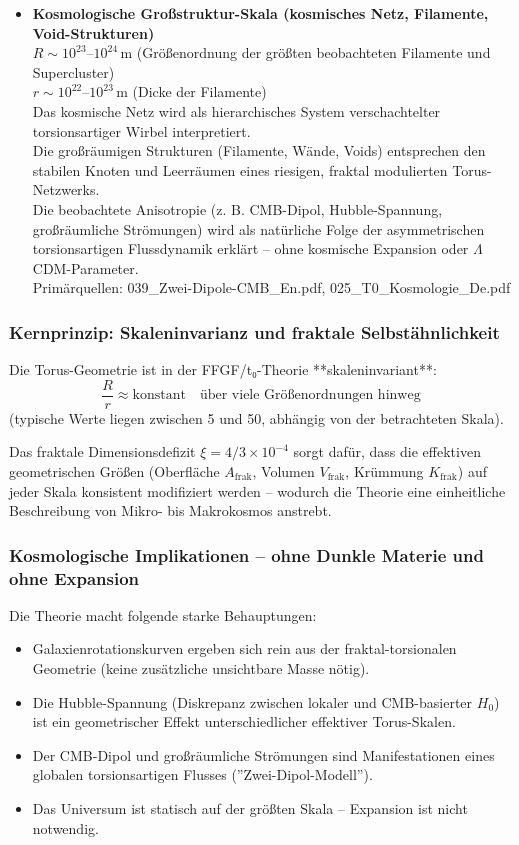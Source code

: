 \documentclass[12pt,a4paper]{article}
\begin{document}
\begin{itemize}
		\item \textbf{Kosmologische Großstruktur-Skala (kosmisches Netz, Filamente, Void-Strukturen)} \\
		$R \sim 10^{23}$–$10^{24}\,\text{m}$ (Größenordnung der größten beobachteten Filamente und Supercluster) \\
		$r \sim 10^{22}$–$10^{23}\,\text{m}$ (Dicke der Filamente) \\
		Das kosmische Netz wird als hierarchisches System verschachtelter torsionsartiger Wirbel interpretiert. \\
		Die großräumigen Strukturen (Filamente, Wände, Voids) entsprechen den stabilen Knoten und Leerräumen eines riesigen, fraktal modulierten Torus-Netzwerks. \\
		Die beobachtete Anisotropie (z. B. CMB-Dipol, Hubble-Spannung, großräumliche Strömungen) wird als natürliche Folge der asymmetrischen torsionsartigen Flussdynamik erklärt – ohne kosmische Expansion oder $\Lambda$CDM-Parameter. \\
		Primärquellen: 039\_Zwei-Dipole-CMB\_En.pdf, 025\_T0\_Kosmologie\_De.pdf
	\end{itemize}
	
	\subsubsection{Kernprinzip: Skaleninvarianz und fraktale Selbstähnlichkeit}
	
	Die Torus-Geometrie ist in der FFGF/t₀-Theorie **skaleninvariant**:
	\[
	\frac{R}{r} \approx \text{konstant} \quad \text{über viele Größenordnungen hinweg}
	\]
	(typische Werte liegen zwischen 5 und 50, abhängig von der betrachteten Skala).
	
	Das fraktale Dimensionsdefizit $\xi = 4/3 \times 10^{-4}$ sorgt dafür, dass die effektiven geometrischen Größen (Oberfläche $A_{\text{frak}}$, Volumen $V_{\text{frak}}$, Krümmung $K_{\text{frak}}$) auf jeder Skala konsistent modifiziert werden – wodurch die Theorie eine einheitliche Beschreibung von Mikro- bis Makrokosmos anstrebt.
	
	\subsubsection{Kosmologische Implikationen – ohne Dunkle Materie und ohne Expansion}
	
	Die Theorie macht folgende starke Behauptungen:
	\begin{itemize}
		\item Galaxienrotationskurven ergeben sich rein aus der fraktal-torsionalen Geometrie (keine zusätzliche unsichtbare Masse nötig).
		\item Die Hubble-Spannung (Diskrepanz zwischen lokaler und CMB-basierter $H_0$) ist ein geometrischer Effekt unterschiedlicher effektiver Torus-Skalen.
		\item Der CMB-Dipol und großräumliche Strömungen sind Manifestationen eines globalen torsionsartigen Flusses (''Zwei-Dipol-Modell'').
		\item Das Universum ist statisch auf der größten Skala – Expansion ist nicht notwendig.
	\end{itemize}
	
\end{document}
